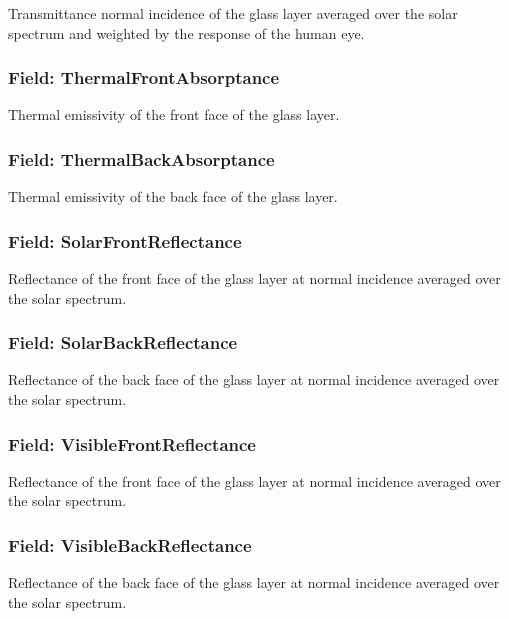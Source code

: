 Transmittance normal incidence of the glass layer averaged over the solar spectrum and weighted by the response of the human eye.

\subsubsection{Field: ThermalFrontAbsorptance}\label{field-thermalfrontabsorptance}

Thermal emissivity of the front face of the glass layer.

\subsubsection{Field: ThermalBackAbsorptance}\label{field-thermalbackabsorptance}

Thermal emissivity of the back face of the glass layer.

\subsubsection{Field: SolarFrontReflectance}\label{field-solarfrontreflectance}

Reflectance of the front face of the glass layer at normal incidence averaged over the solar spectrum.

\subsubsection{Field: SolarBackReflectance}\label{field-solarbackreflectance}

Reflectance of the back face of the glass layer at normal incidence averaged over the solar spectrum.

\subsubsection{Field: VisibleFrontReflectance}\label{field-visiblefrontreflectance}

Reflectance of the front face of the glass layer at normal incidence averaged over the solar spectrum.

\subsubsection{Field: VisibleBackReflectance}\label{field-visiblebackreflectance}

Reflectance of the back face of the glass layer at normal incidence averaged over the solar spectrum.

